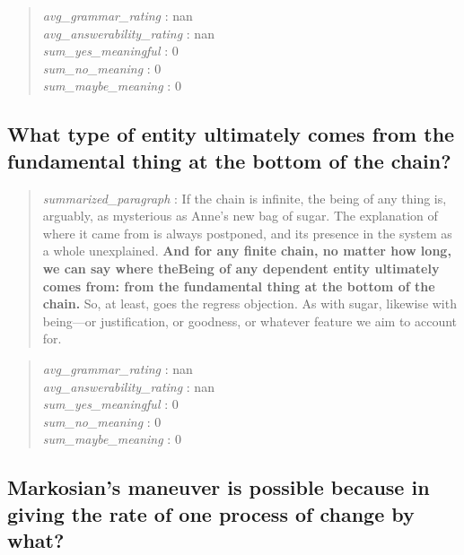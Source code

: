 \begin{quote}
\emph{avg\_grammar\_rating} : nan\\
\emph{avg\_answerability\_rating} : nan\\
\emph{sum\_yes\_meaningful} : 0\\
\emph{sum\_no\_meaning} : 0\\
\emph{sum\_maybe\_meaning} : 0
\end{quote}

\hypertarget{what-type-of-entity-ultimately-comes-from-the-fundamental-thing-at-the-bottom-of-the-chain}{%
\subsection{What type of entity ultimately comes from the fundamental
thing at the bottom of the
chain?}\label{what-type-of-entity-ultimately-comes-from-the-fundamental-thing-at-the-bottom-of-the-chain}}

\begin{quote}
\emph{summarized\_paragraph} : If the chain is infinite, the being of
any thing is, arguably, as mysterious as Anne's new bag of sugar. The
explanation of where it came from is always postponed, and its presence
in the system as a whole unexplained. \textbf{And for any finite chain,
no matter how long, we can say where theBeing of any dependent entity
ultimately comes from: from the fundamental thing at the bottom of the
chain.} So, at least, goes the regress objection. As with sugar,
likewise with being---or justification, or goodness, or whatever feature
we aim to account for.
\end{quote}

\begin{quote}
\emph{avg\_grammar\_rating} : nan\\
\emph{avg\_answerability\_rating} : nan\\
\emph{sum\_yes\_meaningful} : 0\\
\emph{sum\_no\_meaning} : 0\\
\emph{sum\_maybe\_meaning} : 0
\end{quote}

\hypertarget{markosians-maneuver-is-possible-because-in-giving-the-rate-of-one-process-of-change-by-what}{%
\subsection{Markosian's maneuver is possible because in giving the rate
of one process of change by
what?}\label{markosians-maneuver-is-possible-because-in-giving-the-rate-of-one-process-of-change-by-what}}

